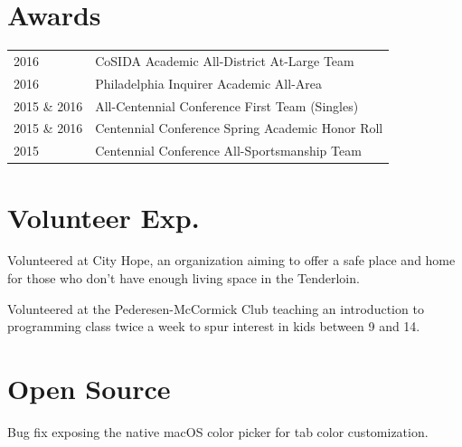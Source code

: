 \documentclass[]{deedy-resume}
\begin{document}
\begin{minipage}[t]{0.33\textwidth}
\section{Awards} 
{\small
\begin{tabular}{p{1cm}p{4cm}}
2016         & CoSIDA Academic All-District At-Large Team \\
2016         & Philadelphia Inquirer Academic All-Area \\
2015 \& 2016         & All-Centennial Conference First Team (Singles) \\
2015 \& 2016         & Centennial Conference Spring Academic Honor Roll \\
2015         & Centennial Conference All-Sportsmanship Team \\
\end{tabular}
}

\sectionspace
\section{Volunteer Exp.}
Volunteered at City Hope, an organization aiming to offer a safe place and home for those who don't have enough living space in the Tenderloin.
\sectionspace

Volunteered at the Pederesen-McCormick Club teaching an introduction to programming class twice a week to spur interest in kids between 9 and 14.
\sectionspace

\section{Open Source}
Bug fix exposing the native macOS color picker for tab color customization.
\sectionspace
\sectionspace

\end{minipage} %
\hfill
\end{document}
